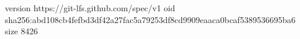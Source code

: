 version https://git-lfs.github.com/spec/v1
oid sha256:abd108cb4fefbd3df42a27fac5a79253df8cd9909eaaca0bcaf5389536695ba6
size 8426
